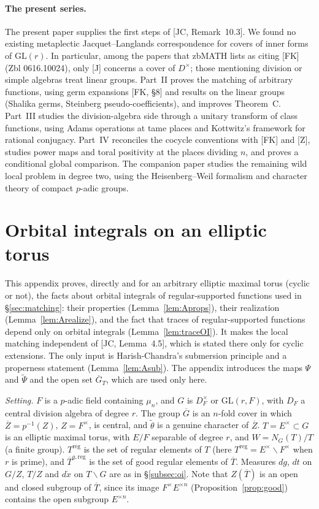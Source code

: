 \documentclass[12pt]{article}
\newcommand{\ov}[1]{\overline{#1}}
\newcommand{\reg}{\mathrm{reg}}
\newcommand{\GL}{\mathrm{GL}}
\newcommand{\Gb}{\ov{G}}
\newcommand{\Zb}{\ov{Z}}
\newcommand{\Tb}{\ov{T}}
\theoremstyle{plain}
\theoremstyle{definition}
\begin{document}
\paragraph{The present series.} The present paper supplies the first steps of [JC, Remark~10.3]. We found no existing metaplectic Jacquet--Langlands correspondence for covers of inner forms of $\GL(r)$. In particular, among the papers that zbMATH lists as citing [FK] (Zbl 0616.10024), only [J] concerns a cover of $D^\times$; those mentioning division or simple algebras treat linear groups. Part~II proves the matching of arbitrary functions, using germ expansions [FK, \S8] and results on the linear groups (Shalika germs, Steinberg pseudo-coefficients), and improves Theorem~C. Part~III studies the division-algebra side through a unitary transform of class functions, using Adams operations at tame places and Kottwitz's framework for rational conjugacy. Part~IV reconciles the cocycle conventions with [FK] and [Z], studies power maps and toral positivity at the places dividing $n$, and proves a conditional global comparison. The companion paper studies the remaining wild local problem in degree two, using the Heisenberg--Weil formalism and character theory of compact $p$-adic groups.

\appendix
\section{Orbital integrals on an elliptic torus}\label{app:oi}
This appendix proves, directly and for an arbitrary elliptic maximal torus (cyclic or not), the facts about orbital integrals of regular-supported functions used in \S\ref{sec:matching}: their properties (Lemma~\ref{lem:Aprops}), their realization (Lemma~\ref{lem:Arealize}), and the fact that traces of regular-supported functions depend only on orbital integrals (Lemma~\ref{lem:traceOI}). It makes the local matching independent of [JC, Lemma~4.5], which is stated there only for cyclic extensions. The only input is Harish-Chandra's submersion principle and a properness statement (Lemma~\ref{lem:Asub}). The appendix introduces the maps $\Psi$ and $\tilde\Psi$ and the open set $\Gb_T$, which are used only here.

\emph{Setting.} $F$ is a $p$-adic field containing $\mu_n$, and $G$ is $D_F^\times$ or $\GL(r,F)$, with $D_F$ a central division algebra of degree $r$. The group $\Gb$ is an $n$-fold cover in which $\Zb=p^{-1}(Z)$, $Z=F^\times$, is central, and $\tilde\theta$ is a genuine character of $\Zb$. $T=E^\times\subset G$ is an elliptic maximal torus, with $E/F$ separable of degree $r$, and $W=N_G(T)/T$ (a finite group). $T^{\reg}$ is the set of regular elements of $T$ (here $T^{\reg}=E^\times\smallsetminus F^\times$ when $r$ is prime), and $\Tb^{g,\reg}$ is the set of good regular elements of $\Tb$. Measures $dg$, $dt$ on $G/Z$, $T/Z$ and $d\dot x$ on $T\backslash G$ are as in \S\ref{subsec:oi}. Note that $Z(\Tb)$ is an open and closed subgroup of $\Tb$, since its image $F^\times E^{\times n}$ (Proposition~\ref{prop:good}) contains the open subgroup $E^{\times n}$.
\end{document}
